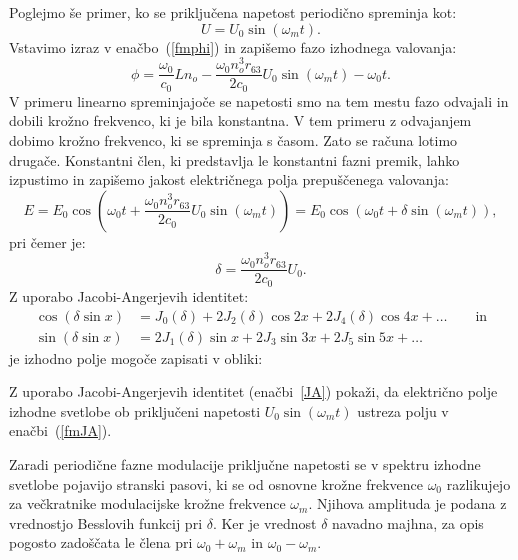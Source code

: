 Poglejmo še primer, ko se priključena napetost periodično spreminja kot:
\begin{equation}
U=U_{0}\sin(\omega_{m}t).
\end{equation}
Vstavimo izraz v enačbo~(\ref{fmphi}) in zapišemo fazo izhodnega valovanja:
\begin{equation}
\phi = \frac{\omega_0}{c_0}L n_o - \frac{\omega_0 n_o^3 r_{63}}{2c_0} U_0\sin(\omega_{m}t)
- \omega_0 t.
\end{equation}
V primeru linearno spreminjajoče se napetosti smo na tem mestu fazo odvajali in dobili krožno frekvenco, ki 
je bila konstantna. V tem primeru z odvajanjem dobimo krožno frekvenco, ki se spreminja s časom. Zato
se računa lotimo drugače. Konstantni člen, ki predstavlja le konstantni fazni premik, 
lahko izpustimo in zapišemo jakost električnega polja prepuščenega valovanja: 
\begin{equation}
E = E_0 \cos\left( \omega_0 t + \frac{\omega_0 n_o^3 r_{63}}{2c_0} U_0\sin(\omega_{m}t)\right)
= E_0 \cos\left( \omega_0 t + \delta \sin(\omega_{m}t)\right)\!,
\end{equation}
pri čemer je:
\begin{equation}
\delta = \frac{\omega_0 n_o^3 r_{63}}{2c_0} U_0.
\end{equation}
Z uporabo Jacobi-Angerjevih identitet: 
\begin{align}
\cos\left(\delta\sin x\right)  &=J_0(\delta)+2J_2(\delta)\cos2x+
2J_4(\delta)\cos4x + \ldots\nonumber \qquad \mathrm{in}\\
\sin\left(\delta\sin x\right) &=2J_1(\delta)\sin x+2J_3\sin3x+
2J_5\sin5x+\ldots
\label{JA}
\end{align}
je izhodno polje mogoče zapisati v obliki:
\begin{naloga}
Z uporabo Jacobi-Angerjevih identitet (enačbi~\ref{JA}) pokaži, da električno polje
izhodne svetlobe ob priključeni napetosti $U_0\sin(\omega_{m}t)$ ustreza
polju v enačbi~(\ref{fmJA}).
\end{naloga}
Zaradi periodične fazne modulacije priključne napetosti se v spektru izhodne svetlobe pojavijo stranski pasovi, ki se
od osnovne krožne frekvence $\omega_0$ razlikujejo za večkratnike modulacijske krožne frekvence $\omega_m$. 
Njihova amplituda je podana z vrednostjo Besslovih funkcij pri $\delta$.
Ker je vrednost $\delta$ navadno majhna, za opis pogosto zadoščata le člena pri $\omega_0+\omega_m$ in 
$\omega_0-\omega_m$.

